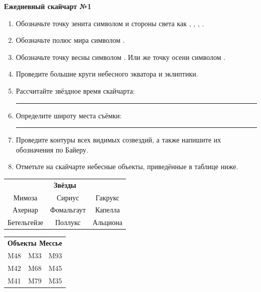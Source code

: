 \documentclass{./SAS-class-skygen}
\begin{document}
    
    
    
	\begin{center}
		\large\textbf{Ежедневный скайчарт №1}
	\end{center}

	\begin{enumerate}
		\item Обозначьте точку зенита символом  и стороны света как , , , .
		\item Обозначьте полюс мира символом .
		\item Обозначьте точку весны символом \Aries. Или же точку осени символом \Libra.
		\item Проведите большие круги небесного экватора и эклиптики.
		\item Рассчитайте звёздное время скайчарта: \rule{2cm}{0.4pt}
		\item Определите широту места съёмки: \rule{2cm}{0.4pt}
		\item Проведите контуры всех видимых созвездий, а также напишите их обозначения по Байеру.
		\item Отметьте на скайчарте небесные объекты, приведённые в таблице ниже.
	\end{enumerate}
	
    \vspace{0.5cm}

    \begin{table}[h!]
    \centering
    \begin{tabular}{ccc}
    \multicolumn{3}{c}{\textbf{Звёзды}} \\ Мимоза & Сириус & Гакрукс \\
Ахернар & Фомальгаут & Капелла \\
Бетельгейзе & Поллукс & Альциона \\

\end{tabular}
    \hfill
    \begin{tabular}{ccc}
    \multicolumn{3}{c}{\textbf{Объекты Мессье}} \\ M48 & M33 & M93 \\
M42 & M68 & M45 \\
M41 & M79 & M35 \\

\end{tabular}
    \end{table}
	
\end{document}
